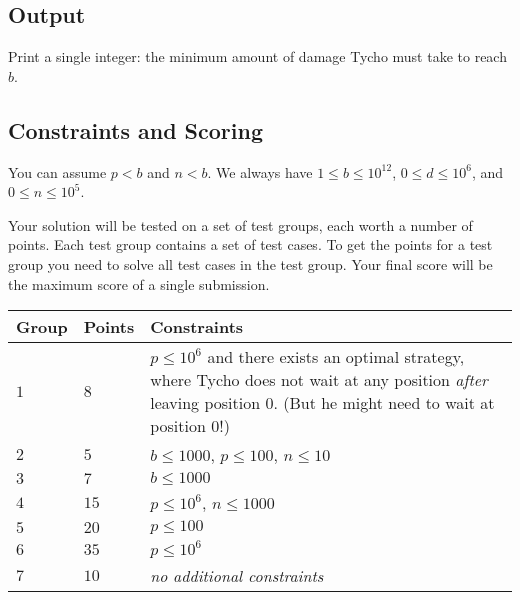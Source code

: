 \subsection*{Output}

Print a single integer: the minimum amount of damage Tycho must take to reach $b$.

\subsection*{Constraints and Scoring}

You can assume
$p < b$ %
and
$n < b$. %
We always have
$1\leq b\leq 10^{12}$, %
$0\leq d \leq 10^6$, %
and
$0\leq n \leq 10^5$. %

Your solution will be tested on a set of test groups, each worth a number of points.
Each test group contains a set of test cases.
To get the points for a test group you need to solve all test cases in the test group.
Your final score will be the maximum score of a single submission.

\medskip
\begin{tabular}{lll}
Group & Points & Constraints \\\hline
  $1$ & $8$  & $p\leq 10^6$ and there exists an optimal strategy, where Tycho does not wait at any position \emph{after} leaving position 0. (But he might need to wait at position 0!) \\ %
  $2$ & $5$  & $b\leq 1000$, $p\leq 100$, $n\leq 10$ \\
  $3$ & $7$  & $b\leq 1000$ \\
  $4$ & $15$ & $p\leq 10^6$, $n\leq 1000$\\
  $5$ & $20$ & $p\leq 100$\\
  $6$ & $35$ & $p\leq 10^6$\\
  $7$ & $10$ & \emph{no additional constraints}
\end{tabular}
